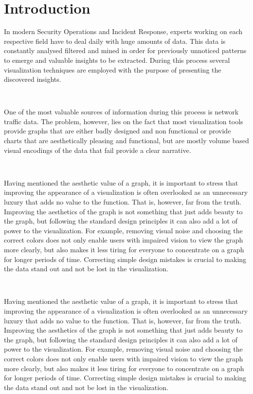 \documentclass[16pt]{extreport}
\begin{document}
\tableofcontents
 

\newpage
\chapter{Introduction}
\parbox{\linewidth}{
	\justify
	\large{In modern Security Operations and Incident Response, experts working on each respective field have to deal daily with huge amounts of data. This data is constantly analysed filtered and mined in order for 	previously unnoticed patterns to emerge and valuable insights to be extracted. During this process several visualization techniques are employed with the purpose of presenting the discovered insights. }
}
\hfill \break\\

\parbox{\linewidth}{
	\justify
	\large{One of the most valuable sources of information during this process is network traffic data. The problem, however, lies on the fact that most visualization tools provide graphs that are either badly designed and non functional or provide charts that are aesthetically pleasing and functional, but are mostly volume based visual encodings of the data that fail provide a clear narrative. }}
\hfill \break\\

\parbox{\linewidth}{
	\justify
	\large{Having mentioned the aesthetic value of a graph, it is important to stress that improving the appearance of a visualization is often overlooked as an unnecessary luxury that adds no value to the function. That is, however, far from the truth. Improving the aesthetics of the graph is not something that just adds beauty to the graph, but following the standard design principles it can also add a lot of power to the visualization. For example, removing visual noise and choosing the correct colors does not only enable users with impaired vision to view the graph more clearly, but also makes it less tiring for everyone to concentrate on a graph for longer periods of time. Correcting simple design mistakes is crucial to making the data stand out and not be lost in the visualization.}}
\hfill \break\\

\parbox{\linewidth}{
	\justify
	\large{Having mentioned the aesthetic value of a graph, it is important to stress that improving the appearance of a visualization is often overlooked as an unnecessary luxury that adds no value to the function. That is, however, far from the truth. Improving the aesthetics of the graph is not something that just adds beauty to the graph, but following the standard design principles it can also add a lot of power to the visualization. For example, removing visual noise and choosing the correct colors does not only enable users with impaired vision to view the graph more clearly, but also makes it less tiring for everyone to concentrate on a graph for longer periods of time. Correcting simple design mistakes is crucial to making the data stand out and not be lost in the visualization.}}
\hfill \break\\
\end{document}
